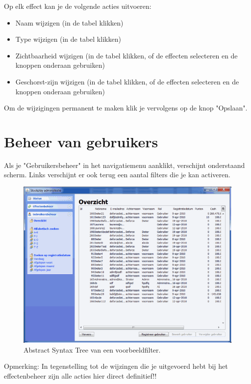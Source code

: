 Op elk effect kan je de volgende acties uitvoeren:

\begin{itemize}
\item{Naam wijzigen (in de tabel klikken)}
\item{Type wijzigen (in de tabel klikken)}
\item{Zichtbaarheid wijzigen (in de tabel klikken, of de effecten selecteren en de knoppen onderaan gebruiken)}
\item{Geschorst-zijn wijzigen (in de tabel klikken, of de effecten selecteren en de knoppen onderaan gebruiken)}
\end{itemize}

Om de wijzigingen permanent te maken klik je vervolgens op de knop "Opslaan".

\section{Beheer van gebruikers}

Als je "Gebruikersbeheer" in het navigatiemenu aanklikt, verschijnt onderstaand scherm.
Links verschijnt er ook terug een aantal filters die je kan activeren.

\begin{figure}[h!]
	\centering
		\includegraphics[width=\textwidth]{images/handleiding/handleiding5.png}
	\caption{Abstract Syntax Tree van een voorbeeldfilter.}
\end{figure}

Opmerking: In tegenstelling tot de wijzingen die je uitgevoerd hebt bij het effectenbeheer zijn alle acties hier direct definitief!!

